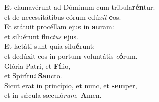 \evenverse Et clamavérunt ad Dóminum cum tribula\textbf{rén}tur:~\*\\
\evenverse et de necessitátibus eórum edú\textit{xit} \textbf{e}os.\\
\oddverse Et státuit procéllam ejus in \textbf{au}ram:~\*\\
\oddverse et siluérunt flu\textit{ctus} \textbf{e}jus.\\
\evenverse Et lætáti sunt quia silu\textbf{é}runt:~\*\\
\evenverse et dedúxit eos in portum voluntátis \textit{e}\textbf{ó}rum.\\
\oddverse Glória Patri, et \textbf{Fí}lio,~\*\\
\oddverse et Spirítu\textit{i} \textbf{San}cto.\\
\evenverse Sicut erat in princípio, et nunc, et \textbf{sem}per,~\*\\
\evenverse et in sǽcula sæculó\textit{rum}. \textbf{A}men.\\

